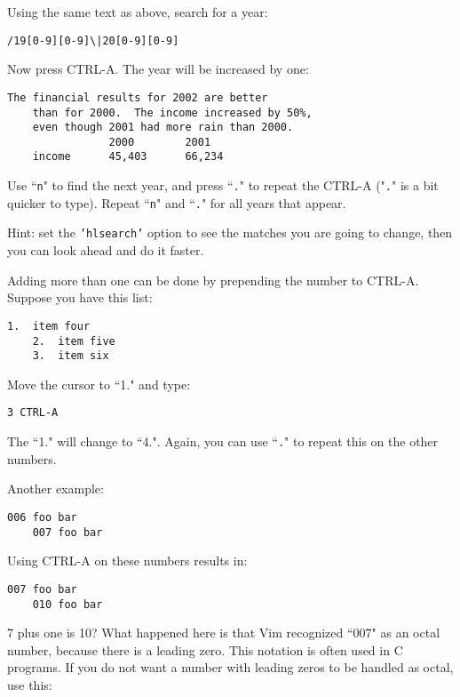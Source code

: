 Using the same text as above, search for a year:

\begin{Verbatim}[samepage=true]
 /19[0-9][0-9]\|20[0-9][0-9]
\end{Verbatim}

Now press CTRL-A.
The year will be increased by one:

\begin{Verbatim}[samepage=true]
    The financial results for 2002 are better 
    than for 2000.  The income increased by 50%, 
    even though 2001 had more rain than 2000. 
                2000        2001 
    income      45,403      66,234 
\end{Verbatim}

Use ``\texttt{n}" to find the next year, and press ``\texttt{.}" to repeat the CTRL-A ("\texttt{.}" is a bit quicker to type).
Repeat ``\texttt{n}" and ``\texttt{.}" for all years that appear.

Hint: set the \texttt{'hlsearch'} option to see the matches you are going to change, then you can look ahead and do it faster.

Adding more than one can be done by prepending the number to CTRL-A.
Suppose you have this list:

\begin{Verbatim}[samepage=true]
    1.  item four 
    2.  item five 
    3.  item six 
\end{Verbatim}

Move the cursor to ``1." and type:

\begin{Verbatim}[samepage=true]
 3 CTRL-A
\end{Verbatim}

The ``1." will change to ``4.".
Again, you can use ``\texttt{.}" to repeat this on the other numbers.

Another example:

\begin{Verbatim}[samepage=true]
    006 foo bar 
    007 foo bar 
\end{Verbatim}

Using CTRL-A on these numbers results in:

\begin{Verbatim}[samepage=true]
    007 foo bar 
    010 foo bar 
\end{Verbatim}

7 plus one is 10?  What happened here is that Vim recognized ``007" as an octal number, because there is a leading zero.
This notation is often used in C programs.
If you do not want a number with leading zeros to be handled as octal, use this:

